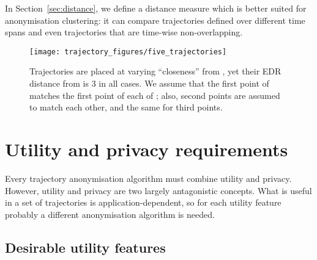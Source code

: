 In Section~\ref{sec:distance}, we define a
distance measure which is better suited for anonymisation
clustering: it can compare trajectories
defined over different time spans and
even trajectories that are time-wise non-overlapping.


\begin{figure}[!ht]
\centering



\texttt{[image: trajectory\_figures/five\_trajectories]}

\caption{Trajectories  are placed at varying
``closeness'' from , yet their EDR distance from 
is 3 in all cases. We assume that the first point of 
matches the first point of each of ; also,
second points are assumed to match each other, and the
same for third points.}
\label{fig:edrdistances}
\end{figure}

\section{Utility and privacy requirements} \label{sec:utilpriv}

Every trajectory anonymisation algorithm must combine utility and privacy.
However, utility and privacy are two largely antagonistic concepts. What is
useful in a set of trajectories is application-dependent, so for each
utility feature probably a different anonymisation algorithm is needed.

\subsection{Desirable utility features}

